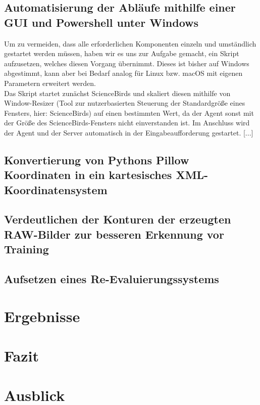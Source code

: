 \documentclass[11pt]{article}
\begin{document}
\subsection{Automatisierung der Abläufe mithilfe einer GUI und Powershell unter Windows}
Um zu vermeiden, dass alle erforderlichen Komponenten einzeln und umständlich gestartet werden müssen, haben wir es uns zur Aufgabe gemacht, ein Skript aufzusetzen, welches diesen Vorgang übernimmt. Dieses ist bisher auf Windows abgestimmt, kann aber bei Bedarf analog für Linux bzw. macOS mit eigenen Parametern erweitert werden.\\Das Skript startet zunächst ScienceBirds und skaliert diesen mithilfe von Window-Resizer (Tool zur nutzerbasierten Steuerung der Standardgröße eines Fensters, hier: ScienceBirds) auf einen bestimmten Wert, da der Agent sonst mit der Größe des ScienceBirds-Fensters nicht einverstanden ist. Im Anschluss wird der Agent und der Server automatisch in der Eingabeaufforderung gestartet. [...]
\subsection{Konvertierung von Pythons Pillow Koordinaten in ein kartesisches XML-Koordinatensystem}
\subsection{Verdeutlichen der Konturen der erzeugten RAW-Bilder zur besseren Erkennung vor Training}
\subsection{Aufsetzen eines Re-Evaluierungssystems}
\section{Ergebnisse}
\section{Fazit}
\section{Ausblick}
\end{document}

